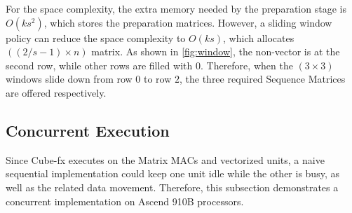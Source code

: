 For the space complexity, the extra memory needed by the preparation stage is $O(ks^2)$, which stores the preparation matrices. However, a sliding window policy can reduce the space complexity to $O(ks)$, which allocates $((2/s - 1) \times n)$ matrix. As shown in \ref{fig:window}, the non-vector is at the second row, while other rows are filled with $0$. Therefore, when the $(3 \times 3)$ windows slide down from row $0$ to row $2$, the three required Sequence Matrices are offered respectively.

\subsection{Concurrent Execution \label{sec:3.3}}

Since Cube-fx executes on the Matrix MACs and vectorized units, a naive sequential implementation could keep one unit idle while the other is busy, as well as the related data movement. Therefore, this subsection demonstrates a concurrent implementation on Ascend 910B processors.


